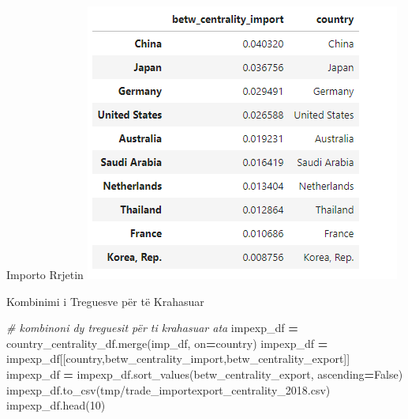 \documentclass[
  ignorenonframetext,
]{beamer}
\newenvironment{Shaded}{\begin{snugshade}}{\end{snugshade}}
\newcommand{\CommentTok}[1]{\textcolor[rgb]{0.56,0.35,0.01}{\textit{#1}}}
\newcommand{\DecValTok}[1]{\textcolor[rgb]{0.00,0.00,0.81}{#1}}
\newcommand{\NormalTok}[1]{#1}
\newcommand{\OperatorTok}[1]{\textcolor[rgb]{0.81,0.36,0.00}{\textbf{#1}}}
\newcommand{\StringTok}[1]{\textcolor[rgb]{0.31,0.60,0.02}{#1}}
\newcommand{\VariableTok}[1]{\textcolor[rgb]{0.00,0.00,0.00}{#1}}
\begin{document}
\begin{frame}{Importo Rrjetin}
\protect\hypertarget{importo-rrjetin}{}
\includegraphics{./Figs/qnyje1.png}
\end{frame}

\begin{frame}[fragile]{Kombinimi i Treguesve për të Krahasuar}
\protect\hypertarget{kombinimi-i-treguesve-puxebr-tuxeb-krahasuar}{}

\begin{Shaded}
\begin{Highlighting}[]
\CommentTok{\# kombinoni dy treguesit për t\textquotesingle{}i krahasuar ata}
\NormalTok{impexp\_df }\OperatorTok{=}\NormalTok{ country\_centrality\_df.merge(imp\_df, on}\OperatorTok{=}\StringTok{\textquotesingle{}country\textquotesingle{}}\NormalTok{)}
\NormalTok{impexp\_df }\OperatorTok{=}\NormalTok{ impexp\_df[[}\StringTok{\textquotesingle{}country\textquotesingle{}}\NormalTok{,}\StringTok{\textquotesingle{}betw\_centrality\_import\textquotesingle{}}\NormalTok{,}\StringTok{\textquotesingle{}betw\_centrality\_export\textquotesingle{}}\NormalTok{]]}
\NormalTok{impexp\_df }\OperatorTok{=}\NormalTok{ impexp\_df.sort\_values(}\StringTok{\textquotesingle{}betw\_centrality\_export\textquotesingle{}}\NormalTok{, ascending}\OperatorTok{=}\VariableTok{False}\NormalTok{)}
\NormalTok{impexp\_df.to\_csv(}\StringTok{\textquotesingle{}tmp/trade\_importexport\_centrality\_2018.csv\textquotesingle{}}\NormalTok{)}
\NormalTok{impexp\_df.head(}\DecValTok{10}\NormalTok{)}
\end{Highlighting}
\end{Shaded}
\end{frame}
\end{document}
